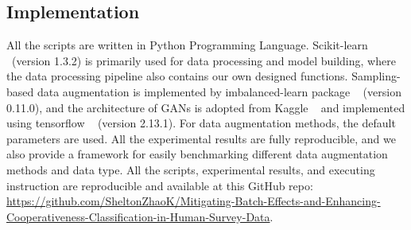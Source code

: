 \subsection{Implementation}
All the scripts are written in Python Programming Language. Scikit-learn ~\cite{sklearn_api}(version 1.3.2) is primarily used for data processing and model building, where the data processing pipeline also contains our own designed functions. Sampling-based data augmentation is implemented by imbalanced-learn package ~\cite{imbalanceLearn} (version 0.11.0), and the architecture of GANs is adopted from Kaggle ~\cite{SEYEDSAMAN_EMAMI} and implemented using tensorflow ~\cite{tensorflow2015} (version 2.13.1). For data augmentation methods, the default parameters are used. All the experimental results are fully reproducible, and we also provide a framework for easily benchmarking different data augmentation methods and data type. All the scripts, experimental results, and executing instruction are reproducible and available at this GitHub repo: \href{https://github.com/SheltonZhaoK/Mitigating-Batch-Effects-and-Enhancing-Cooperativeness-Classification-in-Human-Survey-Data}{https://github.com/SheltonZhaoK/Mitigating-Batch-Effects-and-Enhancing-Cooperativeness-Classification-in-Human-Survey-Data}.

